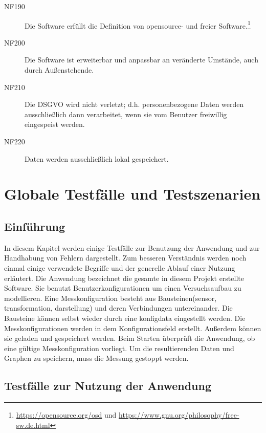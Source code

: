 \documentclass[parskip=full]{scrartcl}
\begin{document}
\begin{description}

\item[NF190] Die Software erfüllt die Definition von \gls{opensource}- und freier Software.\footnote{\url{https://opensource.org/osd} und \url{https://www.gnu.org/philosophy/free-sw.de.html}}
\item[NF200] Die Software ist erweiterbar und anpassbar an veränderte Umstände, auch durch Außenstehende.
\item[NF210] Die \gls{DSGVO} wird nicht verletzt; d.h. personenbezogene Daten werden ausschließlich dann verarbeitet, wenn sie vom Benutzer freiwillig eingespeist werden.
\item[NF220] Daten werden ausschließlich lokal gespeichert.

\end{description}

\clearpage

\section{Globale Testfälle und Testszenarien}\label{testfall}

\subsection{Einführung}

In diesem Kapitel werden einige Testfälle zur Benutzung der Anwendung und zur Handhabung von Fehlern dargestellt. Zum besseren Verständnis werden noch einmal einige verwendete Begriffe und der generelle Ablauf einer Nutzung erläutert. Die Anwendung bezeichnet die gesamte in diesem Projekt erstellte Software. Sie benutzt \gls{Benutzerkonfiguration}en um einen Versuchsaufbau zu modellieren. Eine Messkonfiguration besteht aus Bausteinen(\gls{sensor}, \gls{transformation}, \gls{darstellung}) und deren Verbindungen untereinander. Die Bausteine können selbst wieder  durch eine \gls{konfigdata} eingestellt werden. Die Messkonfigurationen werden in dem Konfigurationsfeld erstellt. Außerdem können sie geladen und gespeichert werden. Beim Starten überprüft die Anwendung, ob eine gültige Messkonfiguration vorliegt. Um die resultierenden Daten und Graphen zu speichern, muss die Messung gestoppt werden.

\subsection{Testfälle zur Nutzung der Anwendung}
\end{document}
